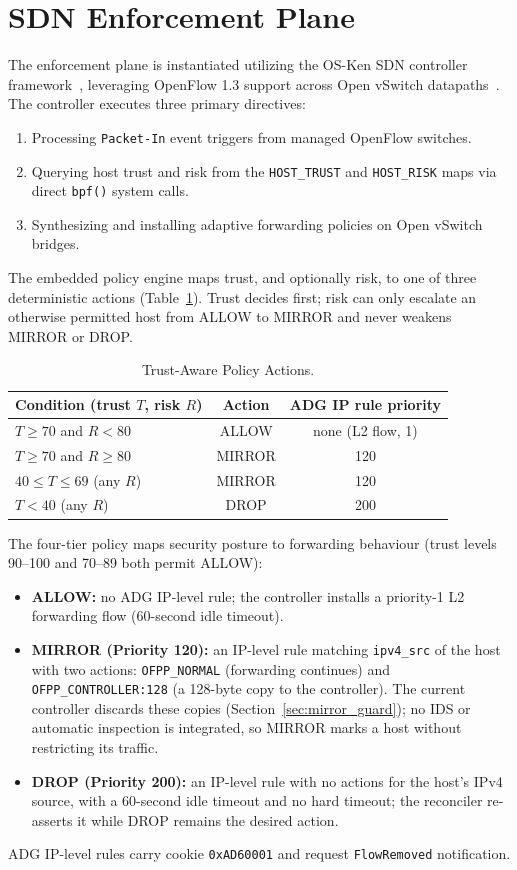 \documentclass[conference]{IEEEtran}
\begin{document}
\section{SDN Enforcement Plane}

The enforcement plane is instantiated utilizing the OS-Ken SDN controller framework~\cite{ryu2023}, leveraging OpenFlow 1.3 support across Open vSwitch datapaths~\cite{ovs2015}. The controller executes three primary directives:
\begin{enumerate}
\item Processing \texttt{Packet-In} event triggers from managed OpenFlow switches.
\item Querying host trust and risk from the \texttt{HOST\_TRUST} and \texttt{HOST\_RISK} maps via direct \texttt{bpf()} system calls.
\item Synthesizing and installing adaptive forwarding policies on Open vSwitch bridges.
\end{enumerate}

The embedded policy engine maps trust, and optionally risk, to one of three deterministic actions (Table~\ref{tab:actions}). Trust decides first; risk can only escalate an otherwise permitted host from ALLOW to MIRROR and never weakens MIRROR or DROP.

\begin{table}[h]
\centering
\caption{Trust-Aware Policy Actions.}
\label{tab:actions}
\begin{tabular}{lcc}
\toprule
Condition (trust $T$, risk $R$) & Action & ADG IP rule priority \\
\midrule
$T \ge 70$ and $R < 80$ & ALLOW & none (L2 flow, 1) \\
$T \ge 70$ and $R \ge 80$ & MIRROR & 120 \\
$40 \le T \le 69$ (any $R$) & MIRROR & 120 \\
$T < 40$ (any $R$) & DROP & 200 \\
\bottomrule
\end{tabular}
\end{table}

The four-tier policy maps security posture to forwarding behaviour (trust levels 90--100 and 70--89 both permit ALLOW):
\begin{itemize}
\item \textbf{ALLOW:} no ADG IP-level rule; the controller installs a priority-1 L2 forwarding flow (60-second idle timeout).
\item \textbf{MIRROR (Priority 120):} an IP-level rule matching \texttt{ipv4\_src} of the host with two actions: \texttt{OFPP\_NORMAL} (forwarding continues) and \texttt{OFPP\_CONTROLLER:128} (a 128-byte copy to the controller). The current controller discards these copies (Section~\ref{sec:mirror_guard}); no IDS or automatic inspection is integrated, so MIRROR marks a host without restricting its traffic.
\item \textbf{DROP (Priority 200):} an IP-level rule with no actions for the host's IPv4 source, with a 60-second idle timeout and no hard timeout; the reconciler re-asserts it while DROP remains the desired action.
\end{itemize}
ADG IP-level rules carry cookie \texttt{0xAD60001} and request \texttt{FlowRemoved} notification.
\end{document}
